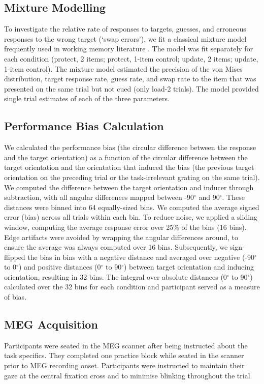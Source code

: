 \documentclass{article}
\begin{document}
\subsection{Mixture Modelling}
To investigate the relative rate of responses to targets, guesses, and erroneous responses to the wrong target (‘swap errors’), we fit a classical mixture model frequently used in working memory literature \parencite{Schneegans2017, Bays2009, Zhang2008}. The model was fit separately for each condition (protect, 2 items; protect, 1-item control; update, 2 items; update, 1-item control). The mixture model estimated the precision of the von Mises distribution, target response rate, guess rate, and swap rate to the item that was presented on the same trial but not cued (only load-2 trials). The model provided single trial estimates of each of the three parameters. \\

\subsection{Performance Bias Calculation}
We calculated the performance bias (the circular difference between the response and the target orientation) as a function of the circular difference between the target orientation and the orientation that induced the bias (the previous target orientation on the preceding trial or the task-irrelevant grating on the same trial). We computed the difference between the target orientation and inducer through subtraction, with all angular differences mapped between -90$^{\circ}$ and 90$^{\circ}$. These distances were binned into 64 equally-sized bins. We computed the average signed error (bias) across all trials within each bin. To reduce noise, we applied a sliding window, computing the average response error over 25\% of the bins (16 bins). Edge artifacts were avoided by wrapping the angular differences around, to ensure the average was always computed over 16 bins. Subsequently, we sign-flipped the bias in bins with a negative distance and averaged over negative (-90$^{\circ}$ to 0$^{\circ}$) and positive distances (0$^{\circ}$ to 90$^{\circ}$) between target orientation and inducing orientation, resulting in 32 bins. The integral over absolute distances (0$^{\circ}$ to 90$^{\circ}$) calculated over the 32 bins for each condition and participant served as a measure of bias. \\

\subsection{MEG Acquisition}
Participants were seated in the MEG scanner after being instructed about the task specifics. They completed one practice block while seated in the scanner prior to MEG recording onset. Participants were instructed to maintain their gaze at the central fixation cross and to minimise blinking throughout the trial. 
\end{document}
